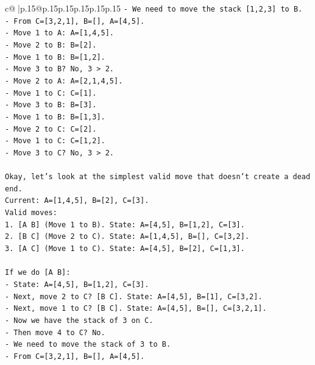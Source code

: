 \documentclass{article}
\begin{document}
{\begin{supertabular}{c@{$\;$}|p{.15\linewidth}@{}p{.15\linewidth}p{.15\linewidth}p{.15\linewidth}p{.15\linewidth}p{.15\linewidth}}
{{{\texttt{{-} We need to move the stack {[}1,2,3{]} to B.} \\
\texttt{{-} From C={[}3,2,1{]}, B={[}{]}, A={[}4,5{]}.} \\
\texttt{{-} Move 1 to A: A={[}1,4,5{]}.} \\
\texttt{{-} Move 2 to B: B={[}2{]}.} \\
\texttt{{-} Move 1 to B: B={[}1,2{]}.} \\
\texttt{{-} Move 3 to B? No, 3 > 2.} \\
\texttt{{-} Move 2 to A: A={[}2,1,4,5{]}.} \\
\texttt{{-} Move 1 to C: C={[}1{]}.} \\
\texttt{{-} Move 3 to B: B={[}3{]}.} \\
\texttt{{-} Move 1 to B: B={[}1,3{]}.} \\
\texttt{{-} Move 2 to C: C={[}2{]}.} \\
\texttt{{-} Move 1 to C: C={[}1,2{]}.} \\
\texttt{{-} Move 3 to C? No, 3 > 2.} \\
\\ 
\texttt{Okay, let's look at the simplest valid move that doesn't create a dead end.} \\
\texttt{Current: A={[}1,4,5{]}, B={[}2{]}, C={[}3{]}.} \\
\texttt{Valid moves:} \\
\texttt{1. {[}A B{]} (Move 1 to B). State: A={[}4,5{]}, B={[}1,2{]}, C={[}3{]}.} \\
\texttt{2. {[}B C{]} (Move 2 to C). State: A={[}1,4,5{]}, B={[}{]}, C={[}3,2{]}.} \\
\texttt{3. {[}A C{]} (Move 1 to C). State: A={[}4,5{]}, B={[}2{]}, C={[}1,3{]}.} \\
\\ 
\texttt{If we do {[}A B{]}:} \\
\texttt{{-} State: A={[}4,5{]}, B={[}1,2{]}, C={[}3{]}.} \\
\texttt{{-} Next, move 2 to C? {[}B C{]}. State: A={[}4,5{]}, B={[}1{]}, C={[}3,2{]}.} \\
\texttt{{-} Next, move 1 to C? {[}B C{]}. State: A={[}4,5{]}, B={[}{]}, C={[}3,2,1{]}.} \\
\texttt{{-} Now we have the stack of 3 on C.} \\
\texttt{{-} Then move 4 to C? No.} \\
\texttt{{-} We need to move the stack of 3 to B.} \\
\texttt{{-} From C={[}3,2,1{]}, B={[}{]}, A={[}4,5{]}.} \\
}}}
\end{supertabular}}
\end{document}
